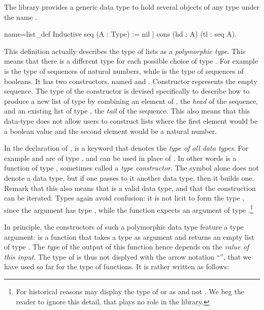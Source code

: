 The \mcbMC{} library provides a generic data type to hold
several objects of any type under the name .

\begin{coq}{name=list_def}{}
Inductive seq (A : Type) := nil | cons (hd : A) (tl : seq A).
\end{coq}
This definition actually describes the type of lists as a {\em
  polymorphic type}.  This means that there is a different type
 for each possible choice of type .  For example
 is the type of sequences of natural numbers, while
 is the type of sequences of booleans. It has two
constructors, named  and . Constructor 
represents the empty sequence. The type of the
constructor  is devised specifically to describe how to produce a
new list of type  by combining an element of , the
\emph{head} of the sequence, and an
existing list of type , the \emph{tail} of the sequence.  This
also means that this data-type
does not allow users to construct lists where the first element would be
a boolean value and the second element would be a natural number.

In the declaration of ,  is a keyword that denotes the
\emph{type of all data types}.  For example  and  are of type
, and can be used in place of .
In other words  is a function of type , sometimes
called a \emph{type constructor}.  The symbol  alone does not
denote a data type,
but if one passes to it another data type, then it builds one.  Remark
that this also means that  is a valid data type, and
that the construction can be iterated.
Types again avoid confusion: it is not licit to form the type ,
since the argument  has type , while the function
 expects an argument of type .\footnote{For historical
reasons \Coq{} may display the type of  or  as 
and not .  We beg the reader to ignore this detail, that
plays no role in the \mcbMC{} library.}

In principle, the constructors of such a polymorphic data type feature
a type argument:
 is a function that takes a type  as argument and returns
an empty list of type . The \emph{type} of the output of
this function hence depends on the \emph{value of this input}. The
type of  is thus not displyed with the arrow notation
``'', that we have used so far for the type of
functions. It is rather written as follows:

